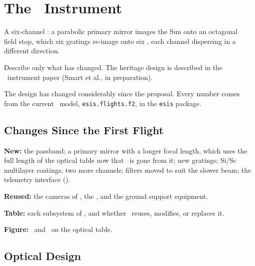 \section{The \ESISII\ Instrument}%
\label{sec:TheESISIIInstrument}%

\begin{outline}
\item A six-channel \CTIS: a parabolic primary mirror images the Sun onto an octagonal field stop,
    which six gratings re-image onto six \CCDs, each channel dispersing in a different direction.
\item Describe only what has changed.
    The heritage design is described in the \ESISI\ instrument paper (Smart et al., in
    preparation). 
\item The design has changed considerably since the proposal.
    Every number comes from the current \ESISII\ model, \texttt{esis.flights.f2}, in the
    \texttt{esis} package.
\end{outline}%
\subsection{Changes Since the First Flight}%
\label{subsec:ChangesSincetheFirstFlight}%

\begin{outline}
\item \textbf{New:} the passband; a primary mirror with a longer focal length, which uses the full
    length of the optical table now that \MOSES\ is gone from it; new gratings; Si/Sc multilayer
    coatings; two more channels; filters moved to suit the slower beam; the telemetry interface
    (\EVTM).
\item \textbf{Reused:} the cameras of \ESISI, the \DACS, and the ground support equipment.
\item \textbf{Table:} each subsystem of \ESISI, and whether \ESISII\ reuses, modifies, or
    replaces it.
\item \textbf{Figure:} \ESISI\ and \ESISII\ on the optical table.
\end{outline}

%
\subsection{Optical Design}%
\label{subsec:OpticalDesign}%

